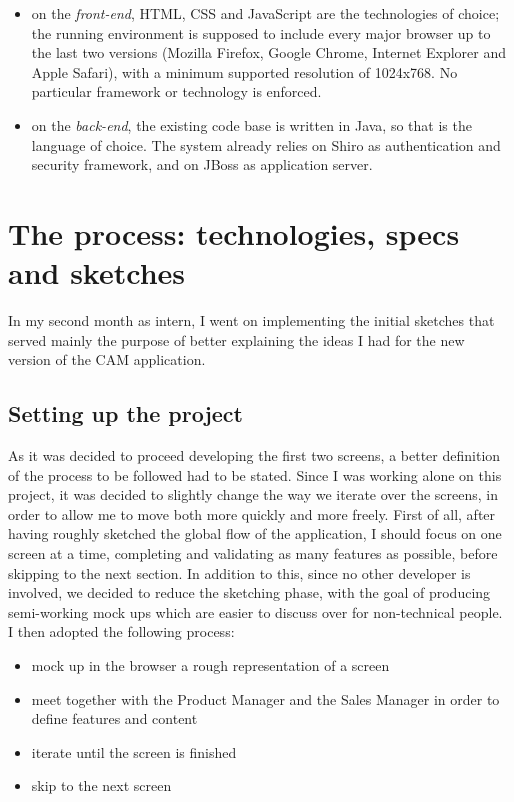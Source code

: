 \documentclass[12pt,oneside,svgnames]{memoir}
\begin{document}
\begin{itemize}
\itemsep1pt\parskip0pt
\item
  on the \emph{front-end}, HTML, CSS and JavaScript are the technologies
  of choice; the running environment is supposed to include every major
  browser up to the last two versions (Mozilla Firefox, Google Chrome,
  Internet Explorer and Apple Safari), with a minimum supported
  resolution of 1024x768. No particular framework or technology is
  enforced.
\item
  on the \emph{back-end}, the existing code base is written in Java, so
  that is the language of choice. The system already relies on Shiro as
  authentication and security framework, and on JBoss as application
  server.
\end{itemize}

\chapter{The process: technologies, specs and
sketches}\label{the-process-technologies-specs-and-sketches}

In my second month as intern, I went on implementing the initial
sketches that served mainly the purpose of better explaining the ideas I
had for the new version of the CAM application.

\section{Setting up the project}\label{setting-up-the-project}

As it was decided to proceed developing the first two screens, a better
definition of the process to be followed had to be stated. Since I was
working alone on this project, it was decided to slightly change the way
we iterate over the screens, in order to allow me to move both more
quickly and more freely. First of all, after having roughly sketched the
global flow of the application, I should focus on one screen at a time,
completing and validating as many features as possible, before skipping
to the next section. In addition to this, since no other developer is
involved, we decided to reduce the sketching phase, with the goal of
producing semi-working mock ups which are easier to discuss over for
non-technical people. I then adopted the following process:

\begin{itemize}
\itemsep1pt\parskip0pt
\item
  mock up in the browser a rough representation of a screen
\item
  meet together with the Product Manager and the Sales Manager in order
  to define features and content
\item
  iterate until the screen is finished
\item
  skip to the next screen
\end{itemize}
\end{document}
